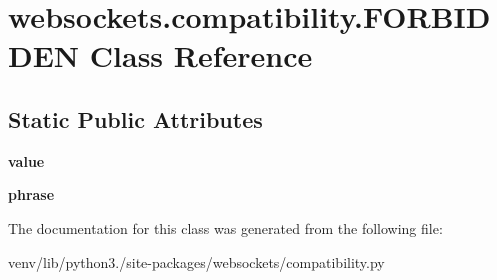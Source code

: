\hypertarget{classwebsockets_1_1compatibility_1_1_f_o_r_b_i_d_d_e_n}{}\section{websockets.\+compatibility.\+F\+O\+R\+B\+I\+D\+D\+EN Class Reference}
\label{classwebsockets_1_1compatibility_1_1_f_o_r_b_i_d_d_e_n}
\subsection*{Static Public Attributes}
\begin{DoxyCompactItemize}
\item 
\mbox{\label{classwebsockets_1_1compatibility_1_1_f_o_r_b_i_d_d_e_n_a7cc0cf7d0e9d093de692f94662f48210}} 
{\bfseries value}
\item 
\mbox{\label{classwebsockets_1_1compatibility_1_1_f_o_r_b_i_d_d_e_n_a5a138f967153cc7592b7199f141a7207}} 
{\bfseries phrase}
\end{DoxyCompactItemize}


The documentation for this class was generated from the following file\+:\begin{DoxyCompactItemize}
\item 
venv/lib/python3./site-\/packages/websockets/compatibility.\+py\end{DoxyCompactItemize}
